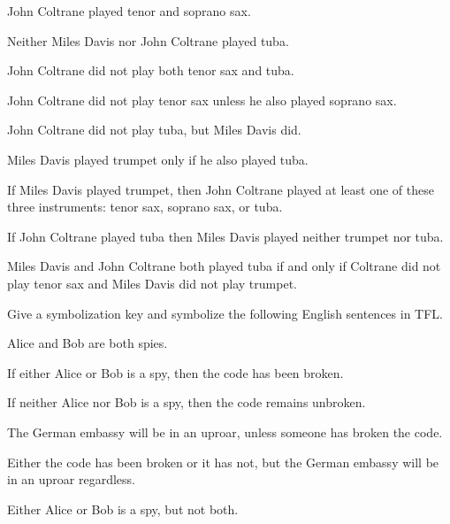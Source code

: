 \begin{earg}
\item John Coltrane played tenor and soprano sax. %
\item Neither Miles Davis nor John Coltrane played tuba. %
\item John Coltrane did not play both tenor sax and tuba.  %
\item John Coltrane did not play tenor sax unless he also played soprano sax. %
\item John Coltrane did not play tuba, but Miles Davis did. %
\item Miles Davis played trumpet only if he also played tuba. %
\item If Miles Davis played trumpet, then John Coltrane played at least one of these three instruments: tenor sax, soprano sax, or tuba. %
\item If John Coltrane played tuba then Miles Davis played neither trumpet nor tuba. %
\item Miles Davis and John Coltrane both played tuba if and only if Coltrane did not play tenor sax and Miles Davis did not play trumpet. %
\end{earg}

\solutions
\problempart
\label{pr.spies}
Give a symbolization key and symbolize the following English sentences in TFL.
\begin{earg}
\item Alice and Bob are both spies.
\item If either Alice or Bob is a spy, then the code has been broken.
\item If neither Alice nor Bob is a spy, then the code remains unbroken.
\item The German embassy will be in an uproar, unless someone has broken the code.
\item Either the code has been broken or it has not, but the German embassy will be in an uproar regardless.
\item Either Alice or Bob is a spy, but not both.
\end{earg}

